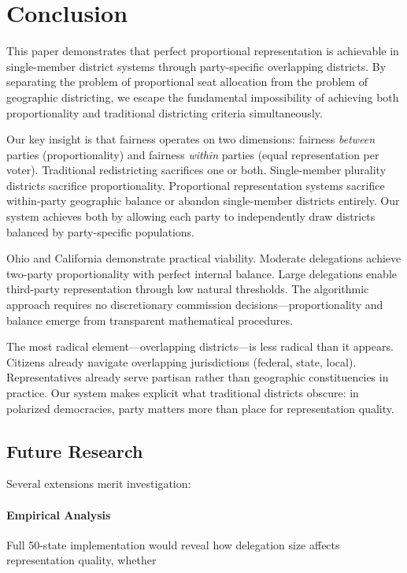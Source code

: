 
\section{Conclusion}

This paper demonstrates that perfect proportional representation is achievable in single-member district systems through party-specific overlapping districts. By separating the problem of proportional seat allocation from the problem of geographic districting, we escape the fundamental impossibility of achieving both proportionality and traditional districting criteria simultaneously.

Our key insight is that fairness operates on two dimensions: fairness \emph{between} parties (proportionality) and fairness \emph{within} parties (equal representation per voter). Traditional redistricting sacrifices one or both. Single-member plurality districts sacrifice proportionality. Proportional representation systems sacrifice within-party geographic balance or abandon single-member districts entirely. Our system achieves both by allowing each party to independently draw districts balanced by party-specific populations.

Ohio and California demonstrate practical viability. Moderate delegations achieve two-party proportionality with perfect internal balance. Large delegations enable third-party representation through low natural thresholds. The algorithmic approach requires no discretionary commission decisions---proportionality and balance emerge from transparent mathematical procedures.

The most radical element---overlapping districts---is less radical than it appears. Citizens already navigate overlapping jurisdictions (federal, state, local). Representatives already serve partisan rather than geographic constituencies in practice. Our system makes explicit what traditional districts obscure: in polarized democracies, party matters more than place for representation quality.

\subsection{Future Research}

Several extensions merit investigation:

\paragraph{Empirical Analysis}
Full 50-state implementation would reveal how delegation size affects representation quality, whether

